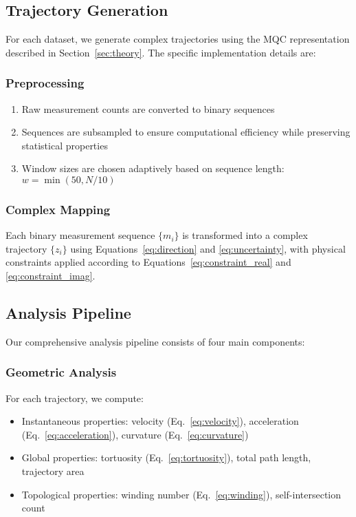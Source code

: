 \subsection{Trajectory Generation}

For each dataset, we generate complex trajectories using the MQC representation described in Section~\ref{sec:theory}. The specific implementation details are:

\subsubsection{Preprocessing}
\begin{enumerate}
\item Raw measurement counts are converted to binary sequences
\item Sequences are subsampled to ensure computational efficiency while preserving statistical properties
\item Window sizes are chosen adaptively based on sequence length: $w = \min(50, N/10)$
\end{enumerate}

\subsubsection{Complex Mapping}
Each binary measurement sequence $\{m_i\}$ is transformed into a complex trajectory $\{z_i\}$ using Equations~\ref{eq:direction} and \ref{eq:uncertainty}, with physical constraints applied according to Equations~\ref{eq:constraint_real} and \ref{eq:constraint_imag}.

\subsection{Analysis Pipeline}

Our comprehensive analysis pipeline consists of four main components:

\subsubsection{Geometric Analysis}
For each trajectory, we compute:
\begin{itemize}
\item Instantaneous properties: velocity (Eq.~\ref{eq:velocity}), acceleration (Eq.~\ref{eq:acceleration}), curvature (Eq.~\ref{eq:curvature})
\item Global properties: tortuosity (Eq.~\ref{eq:tortuosity}), total path length, trajectory area
\item Topological properties: winding number (Eq.~\ref{eq:winding}), self-intersection count
\end{itemize}

